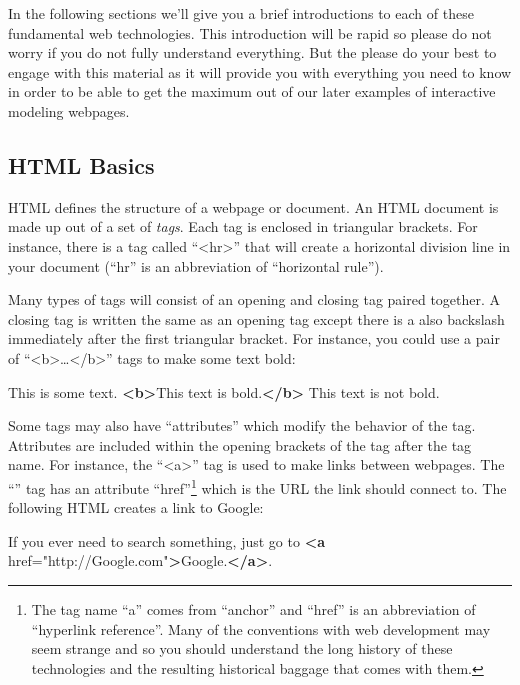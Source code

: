 \documentclass[]{memoir}
\newenvironment{Shaded}{}{}
\newcommand{\KeywordTok}[1]{\textcolor[rgb]{0.00,0.44,0.13}{\textbf{{#1}}}}
\newcommand{\StringTok}[1]{\textcolor[rgb]{0.25,0.44,0.63}{{#1}}}
\newcommand{\OtherTok}[1]{\textcolor[rgb]{0.00,0.44,0.13}{{#1}}}
\newcommand{\NormalTok}[1]{{#1}}
\begin{document}
In the following sections we'll give you a brief introductions to each
of these fundamental web technologies. This introduction will be rapid
so please do not worry if you do not fully understand everything. But
the please do your best to engage with this material as it will provide
you with everything you need to know in order to be able to get the
maximum out of our later examples of interactive modeling webpages.

\subsection{HTML Basics}

HTML defines the structure of a webpage or document. An HTML document is
made up out of a set of \emph{tags}. Each tag is enclosed in triangular
brackets. For instance, there is a tag called
``\textless{}hr\textgreater{}'' that will create a horizontal division
line in your document (``hr'' is an abbreviation of ``horizontal
rule'').

Many types of tags will consist of an opening and closing tag paired
together. A closing tag is written the same as an opening tag except
there is a also backslash immediately after the first triangular
bracket. For instance, you could use a pair of
``\textless{}b\textgreater{}\ldots{}\textless{}/b\textgreater{}'' tags
to make some text bold:

\begin{Shaded}
\begin{Highlighting}[]
\NormalTok{This is some text. }\KeywordTok{<b>}\NormalTok{This text is bold.}\KeywordTok{</b>} \NormalTok{This text is not bold.}
\end{Highlighting}
\end{Shaded}

Some tags may also have ``attributes'' which modify the behavior of the
tag. Attributes are included within the opening brackets of the tag
after the tag name. For instance, the ``\textless{}a\textgreater{}'' tag
is used to make links between webpages. The ``'' tag has an attribute
``href''\footnote{The tag name ``a'' comes from ``anchor'' and ``href''
  is an abbreviation of ``hyperlink reference''. Many of the conventions
  with web development may seem strange and so you should understand the
  long history of these technologies and the resulting historical
  baggage that comes with them.} which is the URL the link should
connect to. The following HTML creates a link to Google:

\begin{Shaded}
\begin{Highlighting}[]
\NormalTok{If you ever need to search something, just go}
\NormalTok{to }\KeywordTok{<a}\OtherTok{ href=}\StringTok{"http://Google.com"}\KeywordTok{>}\NormalTok{Google.}\KeywordTok{</a>}\NormalTok{.}
\end{Highlighting}
\end{Shaded}
\end{document}
